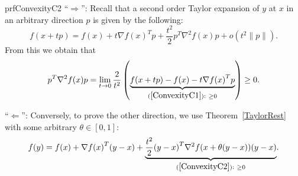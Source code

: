 \begin{prf}{prfConvexityC2}
    ``$\Rightarrow$'': Recall that a second order Taylor expansion of $y$ at $x$ in an arbitrary direction $p$ is given by the following:
    \begin{equation*}
        f(x + tp) = f(x) + t \nabla {f(x)}^T p + \frac{t^2}{2} p^T \nabla^2 f(x) p + o(t^2\|p\|).
    \end{equation*}
    From this we obtain that
    \begin{equation*}
        p^T \nabla^2 f(x) p = \lim_{t \rightarrow 0} \frac{2}{t^2} \left(\underset{(\ref*{ConvexityC1}): \ \geq 0}{\underbrace{f(x + tp) - f(x) - t \nabla {f(x)}^T p}}\right) \geq 0.
    \end{equation*}

    ``$\Leftarrow$'': Conversely, to prove the other direction, we use Theorem~\ref{TaylorRest} with some arbitrary $\theta \in [0,1]$:
    \begin{equation*}
        f(y) = f(x) + \nabla {f(x)}^T(y-x) + \underset{(\ref*{ConvexityC2}): \ \geq 0}{\underbrace{\frac{t^2}{2} {(y-x)}^T \nabla^2 f(x + \theta(y-x)) (y-x)}}.
    \end{equation*}
    \vspace{-0.5cm}
\end{prf}

